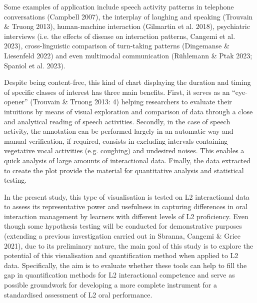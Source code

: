\begin{styleStandard}
Some examples of application include speech activity patterns in telephone conversations (Campbell 2007), the interplay of laughing and speaking (Trouvain \& Truong 2013), human-machine interaction (Gilmartin et al. 2018), psychiatric interviews (i.e. the effects of disease on interaction patterns, Cangemi et al. 2023), cross-linguistic comparison of turn-taking patterns (Dingemanse \& Liesenfeld 2022) and even multimodal communication (Rühlemann \& Ptak 2023; Spaniol et al. 2023). 
\end{styleStandard}

\begin{styleStandard}
Despite being content-free, this kind of chart displaying the duration and timing of specific classes of interest has three main benefits. First, it serves as an “eye-opener” (Trouvain \& Truong 2013: 4) helping researchers to evaluate their intuitions by means of visual exploration and comparison of data through a close and analytical reading of speech activities. Secondly, in the case of speech activity, the annotation can be performed largely in an automatic way and manual verification, if required, consists in excluding intervals containing vegetative vocal activities (e.g. coughing) and undesired noises. This enables a quick analysis of large amounts of interactional data. Finally, the data extracted to create the plot provide the material for quantitative analysis and statistical testing. 
\end{styleStandard}

\begin{styleStandard}
In the present study, this type of visualisation is tested on L2 interactional data to assess its representative power and usefulness in capturing differences in oral interaction management by learners with different levels of L2 proficiency. Even though some hypothesis testing will be conducted for demonstrative purposes (extending a previous investigation carried out in Sbranna, Cangemi \& Grice 2021), due to its preliminary nature, the main goal of this study is to explore the potential of this visualisation and quantification method when applied to L2 data. Specifically, the aim is to evaluate whether these tools can help to fill the gap in quantification methods for L2 interactional competence and serve as possible groundwork for developing a more complete instrument for a standardised assessment of L2 oral performance.
\end{styleStandard}

